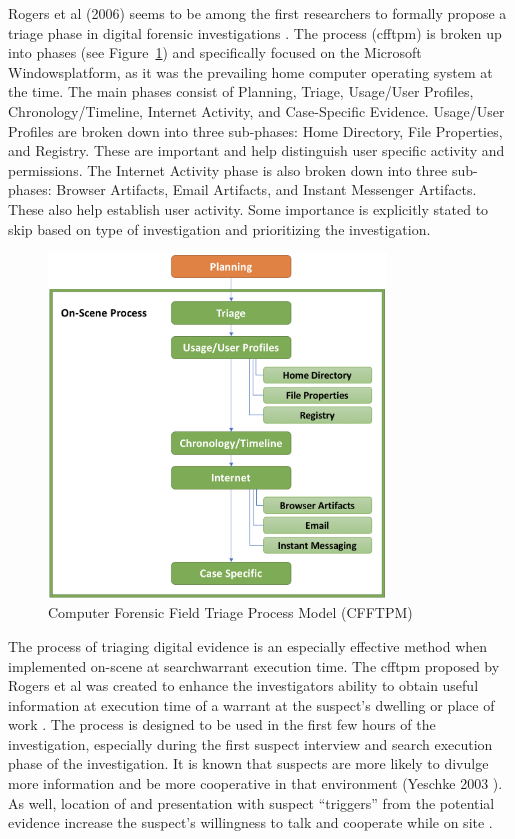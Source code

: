 \documentclass[12pt]{article}
\begin{document}
Rogers et al (2006) seems to be among the first researchers to formally propose a
triage phase in digital forensic investigations \cite{rogers2006computer}.  The process 
(\gls{cfftpm}) is broken up into phases (see Figure~\ref{fig:CFFTPM}) and specifically
focused on the Microsoft Windows\texttrademark platform, as it was the prevailing
home computer operating system at the time. 
The main phases consist of Planning, Triage, Usage/User
Profiles, Chronology/Timeline, Internet Activity, and Case-Specific Evidence.
Usage/User Profiles are broken down into three sub-phases: Home Directory, File
Properties, and Registry.  These are important and help distinguish user specific
activity and permissions.  The Internet Activity phase is also broken down into three
sub-phases: Browser Artifacts, Email Artifacts, and Instant Messenger Artifacts.
These also help establish user activity.  Some importance is explicitly stated to skip
based on type of investigation and prioritizing the investigation.\\

\begin{figure}[ht]
  \centering
    \includegraphics[width=0.8\textwidth]{images/CFFTPM.png}
  \caption{Computer Forensic Field Triage Process Model (CFFTPM)}
  \label{fig:CFFTPM}
\end{figure}

The process of triaging digital evidence is an especially effective method
when implemented on-scene at \gls{searchwarrant} execution time.  The \gls{cfftpm}  proposed
by Rogers et al was created to enhance the investigators ability to obtain
useful information at execution time of a warrant at the suspect's dwelling or place
of work \cite{rogers2006computer}.  The process is designed to be used in the first
few hours of the investigation, especially during the first suspect interview and
search execution phase of the investigation.  It is known that suspects are more
likely to divulge more information and be more cooperative in that environment
(Yeschke 2003 \cite{yeschke2003art}).  As well, location of and presentation with
suspect ``triggers'' from the potential evidence increase the suspect's willingness
to talk and cooperate while on site \cite{rogers2006computer}.\\
\end{document}
